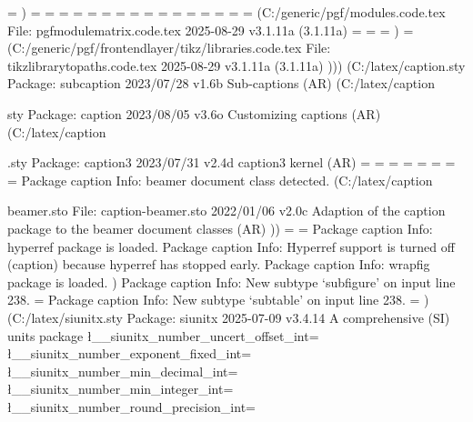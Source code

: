 \pgfplotmarksize=
)
\tikz@lastx=
\tikz@lasty=
\tikz@lastxsaved=
\tikz@lastysaved=
\tikz@lastmovetox=
\tikz@lastmovetoy=
\tikzleveldistance=
\tikzsiblingdistance=
\tikz@figbox=
\tikz@figbox@bg=
\tikz@tempbox=
\tikz@tempbox@bg=
\tikztreelevel=
\tikznumberofchildren=
\tikznumberofcurrentchild=
\tikz@fig@count=
 (C:\Users\SEARS\AppData\Local\Programs\MiKTeX\tex/generic/pgf/modules\pgfmodulematrix.code.tex
File: pgfmodulematrix.code.tex 2025-08-29 v3.1.11a (3.1.11a)
\pgfmatrixcurrentrow=
\pgfmatrixcurrentcolumn=
\pgf@matrix@numberofcolumns=
)
\tikz@expandcount=
 (C:\Users\SEARS\AppData\Local\Programs\MiKTeX\tex/generic/pgf/frontendlayer/tikz/libraries\tikzlibrarytopaths.code.tex
File: tikzlibrarytopaths.code.tex 2025-08-29 v3.1.11a (3.1.11a)
))) (C:\Users\SEARS\AppData\Local\Programs\MiKTeX\tex/latex/caption\subcaption.sty
Package: subcaption 2023/07/28 v1.6b Sub-captions (AR)
 (C:\Users\SEARS\AppData\Local\Programs\MiKTeX\tex/latex/caption\caption.sty
Package: caption 2023/08/05 v3.6o Customizing captions (AR)
 (C:\Users\SEARS\AppData\Local\Programs\MiKTeX\tex/latex/caption\caption3.sty
Package: caption3 2023/07/31 v2.4d caption3 kernel (AR)
\caption@tempdima=
\captionmargin=
\caption@leftmargin=
\caption@rightmargin=
\caption@width=
\caption@indent=
\caption@parindent=
\caption@hangindent=
Package caption Info: beamer document class detected.
 (C:\Users\SEARS\AppData\Local\Programs\MiKTeX\tex/latex/caption\caption-beamer.sto
File: caption-beamer.sto 2022/01/06 v2.0c Adaption of the caption package to the beamer document classes (AR)
))
\c@caption@flags=
\c@continuedfloat=
Package caption Info: hyperref package is loaded.
Package caption Info: Hyperref support is turned off
(caption)             because hyperref has stopped early.
Package caption Info: wrapfig package is loaded.
)
Package caption Info: New subtype `subfigure' on input line 238.
\c@subfigure=
Package caption Info: New subtype `subtable' on input line 238.
\c@subtable=
) (C:\Users\SEARS\AppData\Local\Programs\MiKTeX\tex/latex/siunitx\siunitx.sty
Package: siunitx 2025-07-09 v3.4.14 A comprehensive (SI) units package
\l__siunitx_number_uncert_offset_int=
\l__siunitx_number_exponent_fixed_int=
\l__siunitx_number_min_decimal_int=
\l__siunitx_number_min_integer_int=
\l__siunitx_number_round_precision_int=
